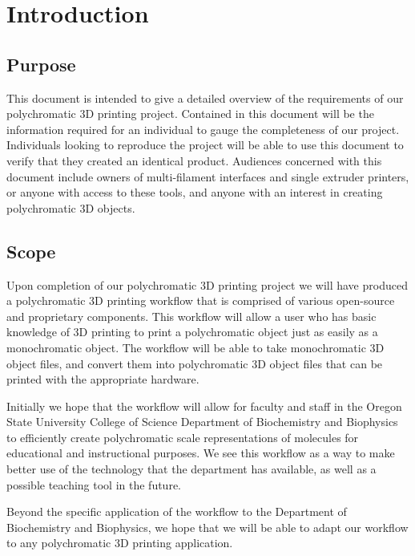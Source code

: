 \documentclass[letterpaper, onecolumn, draftclsnofoot, 10pt, compsoc]{IEEEtran}
\begin{document}
\section{Introduction}

\subsection{Purpose} %
This document is intended to give a detailed overview of the requirements of our polychromatic 3D printing project.
Contained in this document will be the information required for an individual to gauge the completeness of our project.
Individuals looking to reproduce the project will be able to use this document to verify that they created an identical product.
Audiences concerned with this document include owners of multi-filament interfaces and single extruder printers, or anyone with access to these tools, and anyone with an interest in creating polychromatic 3D objects.

\subsection{Scope} %
Upon completion of our polychromatic 3D printing project we will have produced a polychromatic 3D printing workflow that is comprised of various open-source and proprietary components. 
This workflow will allow a user who has basic knowledge of 3D printing to print a polychromatic object just as easily as a monochromatic object. 
The workflow will be able to take monochromatic 3D object files, and convert them into polychromatic 3D object files that can be printed with the appropriate hardware.\par
Initially we hope that the workflow will allow for faculty and staff in the Oregon State University College of Science Department of Biochemistry and Biophysics to efficiently create polychromatic scale representations of molecules for educational and instructional purposes.
We see this workflow as a way to make better use of the technology that the department has available, as well as a possible teaching tool in the future.\par
Beyond the specific application of the workflow to the Department of Biochemistry and Biophysics, we hope that we will be able to adapt our workflow to any polychromatic 3D printing application.\par
\end{document}

